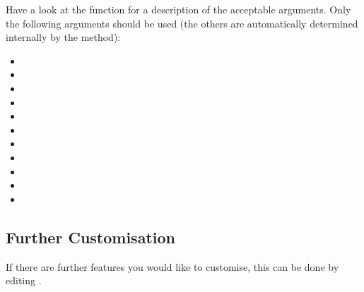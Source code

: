 \documentclass[letterpaper,10pt,english]{sphinxmanual}
\begin{document}
\sphinxAtStartPar
Have a look at the {\hyperref[\detokenize{references/plot:nmrespy.plot.plot_result}]{}} function for a
description of the acceptable arguments. Only the following arguments should
be used (the others are automatically determined internally by the
{\hyperref[\detokenize{references/core:nmrespy.core.Estimator.plot_result}]{}} method):
\begin{itemize}
\item {} 
\sphinxAtStartPar
{}

\item {} 
\sphinxAtStartPar
{}

\item {} 
\sphinxAtStartPar
{}

\item {} 
\sphinxAtStartPar
{}

\item {} 
\sphinxAtStartPar
{}

\item {} 
\sphinxAtStartPar
{}

\item {} 
\sphinxAtStartPar
{}

\item {} 
\sphinxAtStartPar
{}

\item {} 
\sphinxAtStartPar
{}

\item {} 
\sphinxAtStartPar
{}

\item {} 
\sphinxAtStartPar
{}

\end{itemize}


\subsection{Further Customisation}
\label{\detokenize{misc/figure_customisation:further-customisation}}
\sphinxAtStartPar
If there are further features you would like to customise, this can be done
by editing .
\end{document}
